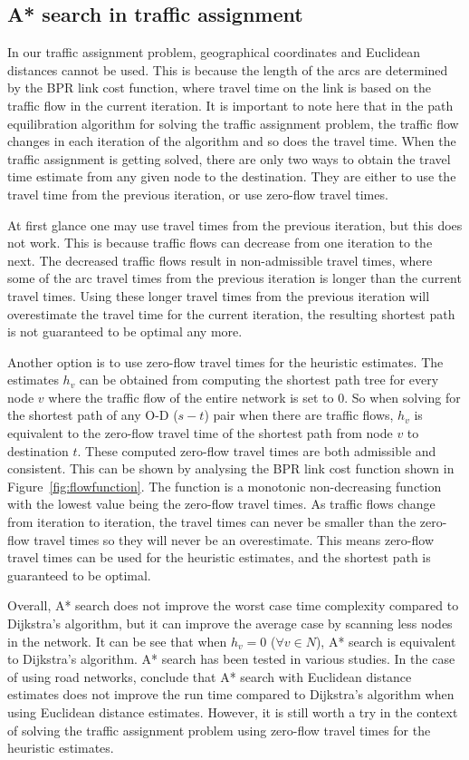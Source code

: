 \subsection{A* search in traffic assignment}
In our traffic assignment problem,
geographical coordinates and Euclidean distances cannot be used.
This is because the length of the arcs are determined by the BPR link cost function,
where travel time on the link is based on the traffic flow in the current iteration.
It is important to note here that in the path equilibration algorithm for solving the traffic assignment problem,
the traffic flow changes in each iteration of the algorithm and so does the travel time.
When the traffic assignment is getting solved,
there are only two ways to obtain the travel time estimate from any given node to the destination.
They are either to use the travel time from the previous iteration,
or use zero-flow travel times.

At first glance one may use travel times from the previous iteration,
but this does not work.
This is because traffic flows can decrease from one iteration to the next.
The decreased traffic flows result in non-admissible travel times,
where some of the arc travel times from the previous iteration is longer than the current travel times.
Using these longer travel times from the previous iteration will overestimate the travel time for the current iteration,
the resulting shortest path is not guaranteed to be optimal any more.

Another option is to use zero-flow travel times for the heuristic estimates.
The estimates $h_v$ can be obtained from computing the shortest path tree for every node $v$ where the traffic flow of the entire network is set to 0.
So when solving for the shortest path of any O-D ($s-t$) pair when there are traffic flows,
$h_v$ is equivalent to the zero-flow travel time of the shortest path from node $v$ to destination $t$.
These computed zero-flow travel times are both admissible and consistent.
This can be shown by analysing the BPR link cost function shown in Figure~\ref{fig:flowfunction}.
The function is a monotonic non-decreasing function with the lowest value being the zero-flow travel times.
As traffic flows change from iteration to iteration,
the travel times can never be smaller than the zero-flow travel times so they will never be an overestimate.
This means zero-flow travel times can be used for the heuristic estimates, and the shortest path is guaranteed to be optimal.

Overall, A* search does not improve the worst case time complexity compared to Dijkstra's algorithm,
but it can improve the average case by scanning less nodes in the network.
It can be see that when $h_v = 0$ ($\forall v \in N$), A* search is equivalent to Dijkstra's algorithm.
A* search has been tested in various studies.
In the case of using road networks,
\citet{GoldbergLandmarks} conclude that A* search with Euclidean distance estimates does not improve the run time compared to Dijkstra's algorithm when using Euclidean distance estimates.
However, it is still worth a try in the context of solving the traffic assignment problem using zero-flow travel times for the heuristic estimates.

